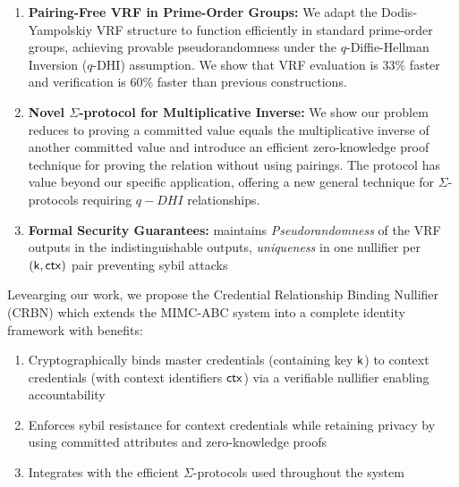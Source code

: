 \begin{enumerate}
        \item \textbf{Pairing-Free VRF in Prime-Order Groups:} We adapt the Dodis-Yampolskiy VRF structure to function efficiently in standard prime-order groups, achieving provable pseudorandomness under the $q$-Diffie-Hellman Inversion ($q$-DHI) assumption. We show that VRF evaluation is 33\% faster and verification is 60\% faster than previous constructions.

        \item \textbf{Novel $\Sigma$-protocol for Multiplicative Inverse:} We show our problem reduces to proving a committed value equals the multiplicative inverse of another committed value and introduce an efficient zero-knowledge proof technique for proving the relation without using pairings. The protocol has value beyond our specific application, offering a new general technique for $\Sigma$-protocols requiring $q-DHI$ relationships.

         \item \textbf{Formal Security Guarantees:} maintains \emph{Pseudorandomness} of the VRF outputs in the indistinguishable outputs, \emph{uniqueness} in one nullifier per $(\mathsf{k}, \mathsf{ctx})$ pair preventing sybil attacks

\end{enumerate}

Levearging our work, we propose the Credential Relationship Binding Nullifier (CRBN) which extends the MIMC-ABC system into a complete identity framework with benefits:

\begin{enumerate}
    \item Cryptographically binds master credentials (containing key $\mathsf{k}$) to context credentials (with context identifiers $\mathsf{ctx}$) via a verifiable nullifier enabling accountability

    \item Enforces sybil resistance for context credentials while retaining privacy by using committed attributes and zero-knowledge proofs

    \item Integrates with the efficient $\Sigma$-protocols used throughout the system
    
\end{enumerate}















